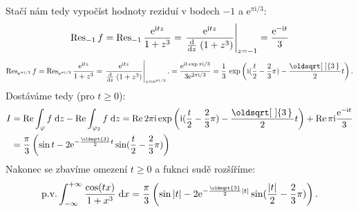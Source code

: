 \documentclass[10pt,a4paper]{article}
\renewcommand*{\sqrt}[2][\ ]{\oldsqrt[#1]{#2\,}\,}
\newcommand{\const}[1]{\text{#1}}
\newcommand{\Res}{\operatorname{Res}}
\renewcommand{\Re}{\operatorname{Re}}
\renewcommand{\d}[1]{\;\const{d}#1}
\newcommand{\dd}[2]{\frac{\const{d} #1}{\const{d} #2} \;}
\newcommand{\e}[1]{\const{e}^{#1}}
\renewcommand{\i}{\const{i}}
\begin{document}
Stačí nám tedy vypočíst hodnoty reziduí v bodech $-1$ a $\e{\pi\i/3}$:
\begin{equation*}
    \Res_{-1} f
    = \Res_{-1} \frac{\e{\i tz}}{1 + z^3}
    = \left.\frac{\e{\i tz}}{\dd{}{z} (1 + z^3)}\right|_{z=-1}
    = \frac{\e{-\i t}}{3}
    \\[5pt]
\end{equation*}
\begin{equation*}
    \Res_{\e{\pi\i/3}} f
    = \Res_{\e{\pi\i/3}} \frac{\e{\i tz}}{1 + z^3}
    = \left.\frac{\e{\i tz}}{\dd{}{z} (1 + z^3)}\right|_{z=\e{\pi\i/3}}.
    = \frac{\e{\i t \exp \pi\i/3}}{3\e{2\pi\i/3}}
    = \frac{1}{3} \, \exp \left( \i( \frac{t}{2} - \frac{2}{3}\pi) - \frac{\sqrt{3}}{2}t \right).
\end{equation*}
Dostáváme tedy (pro $t\geq 0$):
\begin{align*}
    I &= \Re\int_\varphi f \d{z} - \Re\int_{\varphi_2} f \d{z}
    = \Re 2\pi\i \exp \left( \i( \frac{t}{2} - \frac{2}{3}\pi) - \frac{\sqrt{3}}{2}t \right) + \Re \pi\i \frac{\e{-\i t}}{3}
    \\
    &= \frac{\pi}{3} \left(
        \sin t - 2 \e{-\frac{\oldsqrt{3}}{2} t} \sin(\frac{t}{2} - \frac{2}{3}\pi)
    \right)
\end{align*}
Nakonec se zbavíme omezení $t\geq 0$ a fuknci sudě rozšíříme:
\begin{equation*}
    \const{p.v.} \int_{-\infty}^{+\infty} \frac{\cos(tx)}{1+x^3} \d{x}
    = \frac{\pi}{3} \left(
        \sin |t| - 2 \e{-\frac{\oldsqrt{3}}{2} |t|} \sin(\frac{|t|}{2} - \frac{2}{3}\pi)
    \right).
\end{equation*}
\end{document}
